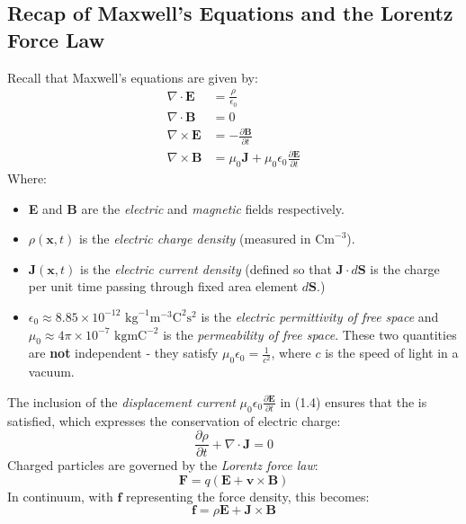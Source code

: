 \documentclass[a4paper]{article}
\numberwithin{equation}{section}
\begin{document}
\subsection{Recap of Maxwell's Equations and the Lorentz Force Law}
Recall that Maxwell's equations are given by:
\begin{align}
\nabla \cdot \mathbf{E} &=\frac{\rho}{\epsilon_0} \label{max1} \\
\nabla \cdot \mathbf{B} &=0 \label{max2} \\ 
\nabla \times \mathbf{E} &= -\frac{\partial \mathbf{B}}{\partial t} \label{max3} \\
\nabla \times \mathbf{B} &= \mu_0 \mathbf{J} +\mu_0\epsilon_0 \frac{\partial \mathbf{E}}{\partial{t}} \label{max4}
\end{align}
Where:
\begin{itemize}
\item \textbf{E} and \textbf{B} are the \textit{electric} and \textit{magnetic} fields respectively.
\item $\rho(\mathbf{x},t)$ is the \textit{electric charge density} (measured in $\text{Cm}^{-3}$).
\item $\mathbf{J}(\mathbf{x},t)$ is the \textit{electric current density} (defined so that $\mathbf{J}\cdot d\mathbf{S}$ is the charge per unit time passing through fixed area element $d \mathbf{S}$.)
\item $\epsilon_0 \approx 8.85\times 10^{-12} \text{ kg}^{-1} \text{m}^{-3} \text{C}^{2} \text{s}^2$ is the \textit{electric permittivity of free space} and $\mu_0 \approx 4\pi \times 10^{-7} \text{ kgmC}^{-2}$ is the \textit{permeability of free space}. These two quantities are \textbf{not} independent - they satisfy $\mu_0 \epsilon_0 = \frac{1}{c^2}$, where $c$ is the speed of light in a vacuum.
\end{itemize}
The inclusion of the \textit{displacement current} $\mu_0 \epsilon_0 \frac{\partial \mathbf{E}}{\partial t}$ in (1.4) ensures that the  is satisfied, which expresses the conservation of electric charge:
\begin{equation} \label{ceq}
\frac{\partial \rho}{\partial t} + \nabla \cdot \mathbf{J} = 0
\end{equation}
Charged particles are governed by the \textit{Lorentz force law}:
\begin{equation}
\mathbf{F}=q(\mathbf{E}+\mathbf{v}\times\mathbf{B})
\end{equation}
In continuum, with $\mathbf{f}$ representing the force density, this becomes:
\begin{equation}
\mathbf{f}=\rho \mathbf{E}+\mathbf{J} \times \mathbf{B}
\end{equation}
\end{document}
